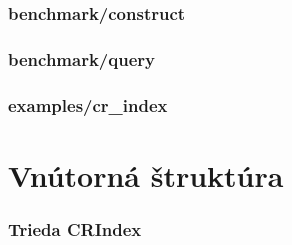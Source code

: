 \subsubsection{benchmark/construct}

\subsubsection{benchmark/query}

\subsubsection{examples/cr\_index}

\section{Vnútorná štruktúra}

\subsubsection{Trieda CRIndex}